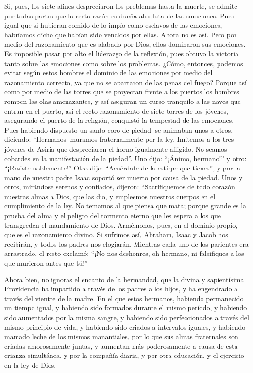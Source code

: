  Si, pues, los siete afines despreciaron los problemas
hasta la muerte, se admite por todas partes que la recta razón es dueña
absoluta de las emociones.  Pues igual que si hubieran
comido de lo impío como esclavos de las emociones, habríamos dicho que
habían sido vencidos por ellas.  Ahora no es así. Pero por
medio del razonamiento que es alabado por Dios, ellos dominaron sus
emociones.  Es imposible pasar por alto el liderazgo de la
reflexión, pues obtuvo la victoria tanto sobre las emociones como sobre
los problemas.  ¿Cómo, entonces, podemos evitar según
estos hombres el dominio de las emociones por medio del razonamiento
correcto, ya que no se apartaron de las penas del fuego? 
Porque así como por medio de las torres que se proyectan frente a los
puertos los hombres rompen las olas amenazantes, y así aseguran un curso
tranquilo a las naves que entran en el puerto,  así el
recto razonamiento de siete torres de los jóvenes, asegurando el puerto
de la religión, conquistó la tempestad de las emociones. 
Pues habiendo dispuesto un santo coro de piedad, se animaban unos a
otros, diciendo:  ``Hermanos, muramos fraternalmente por
la ley. Imitemos a los tres jóvenes de Asiria que despreciaron el horno
igualmente afligido.  No seamos cobardes en la
manifestación de la piedad''.  Uno dijo: ``¡Ánimo,
hermano!'' y otro: ``¡Resiste noblemente!''  Otro dijo:
``Acuérdate de la estirpe que tienes'', y por la mano de nuestro padre
Isaac soportó ser muerto por causa de la piedad.  Unos y
otros, mirándose serenos y confiados, dijeron: ``Sacrifiquemos de todo
corazón nuestras almas a Dios, que las dio, y empleemos nuestros cuerpos
en el cumplimiento de la ley.  No temamos al que piensa
que mata;  porque grande es la prueba del alma y el
peligro del tormento eterno que les espera a los que transgreden el
mandamiento de Dios.  Armémonos, pues, en el dominio
propio, que es el razonamiento divino.  Si sufrimos así,
Abraham, Isaac y Jacob nos recibirán, y todos los padres nos elogiarán.
 Mientras cada uno de los parientes era arrastrado, el
resto exclamó: ``¡No nos deshonres, oh hermano, ni falsifiques a los que
murieron antes que tú!''

 Ahora bien, no ignoras el encanto de la hermandad, que
la divina y sapientísima Providencia ha impartido a través de los padres
a los hijos, y ha engendrado a través del vientre de la madre.
 En el que estos hermanos, habiendo permanecido un tiempo
igual, y habiendo sido formados durante el mismo período, y habiendo
sido aumentados por la misma sangre, y habiendo sido perfeccionados a
través del mismo principio de vida,  y habiendo sido
criados a intervalos iguales, y habiendo mamado leche de los mismos
manantiales, por lo que sus almas fraternales son criadas amorosamente
juntas,  y aumentan más poderosamente a causa de esta
crianza simultánea, y por la compañía diaria, y por otra educación, y el
ejercicio en la ley de Dios.

